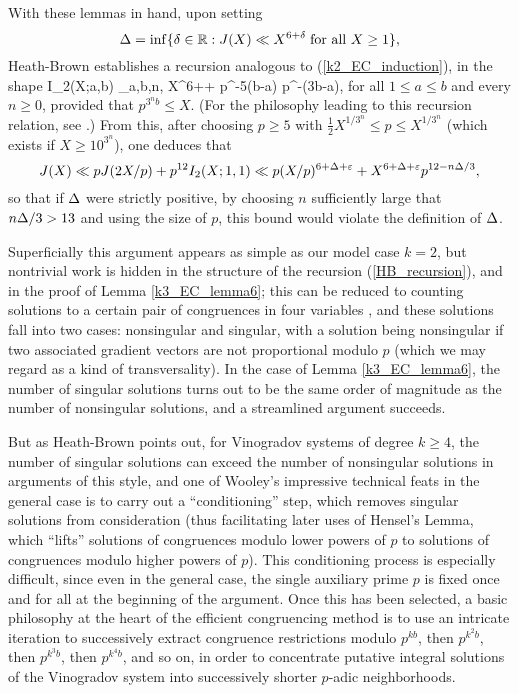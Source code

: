 \documentclass[brochure,english,12pt]{bourbaki}%
\begin{document}
With these lemmas in hand, upon setting 
\[ \Delta = \inf \{ \delta \in \mathbb{R} : J(X) \ll X^{6+\delta} \; \text{for all $X \geq 1$}\},\]
 Heath-Brown establishes a recursion analogous to (\ref{k2_EC_induction}), 
in the shape
 \beq\label{HB_recursion}
 I_2(X;a,b) \ll_{a,b,n,\ep} X^{6+\Del + \ep}p^{-5(b-a)} p^{-(3b-a)},
 \eeq
for all $1 \leq a \leq b$ and every $n \geq 0$, provided that $p^{3^nb} \leq X$.
(For the philosophy leading to this recursion relation, see \cite[\S 4]{HB15x}.)
From this, after choosing $p \geq 5$ with $\frac{1}{2}X^{1/3^n} \leq p \leq X^{1/3^n}$ (which exists if $X \geq 10^{3^n}$), 
one deduces that 
\[ J(X) \ll pJ(2X/p)  + p^{12}I_2(X;1,1) \ll p(X/p)^{6+\Delta + \varepsilon}  + X^{6+\Delta + \varepsilon} p^{12 - n\Delta/3},\]
so that if $\Delta$ were strictly positive, by choosing $n$ sufficiently large that $n\Delta/3>13$ and using the size of $p$, this bound would violate the definition of $\Delta$. 

Superficially this argument appears as simple as our model case $k=2$, but  nontrivial work is hidden in the structure of the recursion (\ref{HB_recursion}), and in the proof of Lemma \ref{k3_EC_lemma6}; this can be reduced to counting solutions to a certain pair of congruences in four variables \cite[Lemma 8]{HB15x}, and these solutions fall into two cases: nonsingular and singular, with a solution being nonsingular if two associated gradient vectors are not proportional modulo $p$ (which we may  regard as a kind of transversality). In the case of Lemma \ref{k3_EC_lemma6}, the number of singular solutions turns out to be the same order of magnitude as the number of nonsingular solutions, and a streamlined argument  succeeds. 

But as Heath-Brown points out, for  Vinogradov systems of degree $k \geq 4$, the number of singular solutions can exceed the number of nonsingular solutions in arguments of this style, and one of Wooley's impressive technical feats in the general case is to carry out a ``conditioning'' step, which removes singular solutions from consideration (thus facilitating later uses of Hensel's Lemma, which ``lifts'' solutions of congruences modulo lower powers of $p$ to solutions of congruences modulo higher powers of $p$). This conditioning process is especially difficult, since even in the general case, the single auxiliary prime $p$ is fixed once and for all at the beginning of the argument. Once this has been selected, a basic philosophy at the heart of the efficient congruencing method is to use an intricate iteration to successively extract congruence restrictions modulo $p^{kb}$, then $p^{k^2b}$, then $p^{k^3b}$, then $p^{k^4b}$, and so on, in order to concentrate putative integral solutions of the Vinogradov system into successively shorter $p$-adic neighborhoods.
\end{document}
